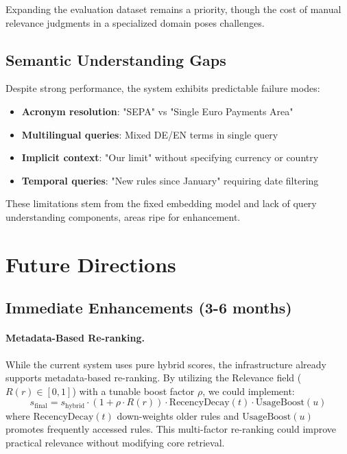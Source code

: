 Expanding the evaluation dataset remains a priority, though the cost of manual relevance judgments in a specialized domain poses challenges.

\subsection{Semantic Understanding Gaps}

Despite strong performance, the system exhibits predictable failure modes:

\begin{itemize}[leftmargin=*,itemsep=2pt,topsep=2pt]
 \item \textbf{Acronym resolution}: "SEPA" vs "Single Euro Payments Area"
 \item \textbf{Multilingual queries}: Mixed DE/EN terms in single query
 \item \textbf{Implicit context}: "Our limit" without specifying currency or country
 \item \textbf{Temporal queries}: "New rules since January" requiring date filtering
\end{itemize}

These limitations stem from the fixed embedding model and lack of query understanding components, areas ripe for enhancement.

\section{Future Directions}

\subsection{Immediate Enhancements (3-6 months)}

\paragraph{Metadata-Based Re-ranking.} While the current system uses pure hybrid scores, the infrastructure already supports metadata-based re-ranking. By utilizing the Relevance field ($R(r) \in [0,1]$) with a tunable boost factor $\rho$, we could implement:
\[
s_{\text{final}} = s_{\text{hybrid}} \cdot (1 + \rho \cdot R(r)) \cdot \text{RecencyDecay}(t) \cdot \text{UsageBoost}(u)
\]
where $\text{RecencyDecay}(t)$ down-weights older rules and $\text{UsageBoost}(u)$ promotes frequently accessed rules. This multi-factor re-ranking could improve practical relevance without modifying core retrieval.

